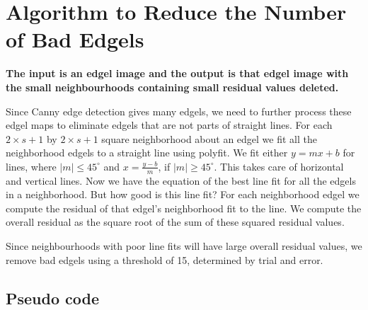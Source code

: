 \section{Algorithm to Reduce the Number of Bad Edgels}

\textbf{The input is an edgel image and the output
is that edgel image with the small neighbourhoods containing small residual
values deleted.}

Since Canny edge detection gives many edgels, we need to further process
these edgel maps to eliminate edgels that are not parts of straight lines.
For each $2\times s+1$ by $2\times s+1$ square neighborhood about an edgel
we fit all the neighborhood edgels to a straight line using polyfit. We
fit either $y=mx+b$ for lines, where $\left|m\right| \leq 45^{\circ}$ and
$x=\frac{y-b}{m}$, if $\left|m\right| \geq 45^{\circ}$.
This takes care of horizontal and vertical lines. Now we have the equation
of the best line fit for all the edgels in a neighborhood. But how good is
this line fit? For each neighborhood edgel we compute the residual of that
edgel’s neighborhood fit to the line. We compute the overall residual as
the square root of the sum of these squared residual values.

Since neighbourhoods with poor line fits will have large overall residual
values, we remove bad edgels using a threshold of 15, determined by trial and error.

\subsection{Pseudo code}

